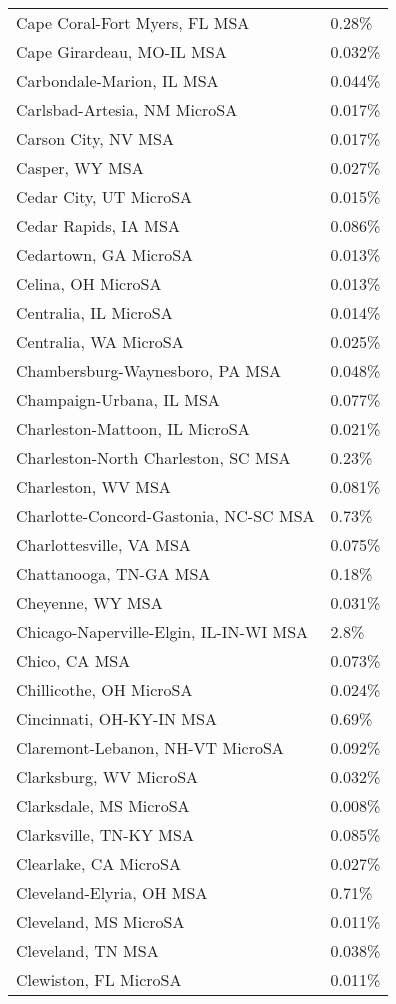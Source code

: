 \begin{longtable}[]{@{}ll@{}}
Cape Coral-Fort Myers, FL MSA & 0.28\% \\
Cape Girardeau, MO-IL MSA & 0.032\% \\
Carbondale-Marion, IL MSA & 0.044\% \\
Carlsbad-Artesia, NM MicroSA & 0.017\% \\
Carson City, NV MSA & 0.017\% \\
Casper, WY MSA & 0.027\% \\
Cedar City, UT MicroSA & 0.015\% \\
Cedar Rapids, IA MSA & 0.086\% \\
Cedartown, GA MicroSA & 0.013\% \\
Celina, OH MicroSA & 0.013\% \\
Centralia, IL MicroSA & 0.014\% \\
Centralia, WA MicroSA & 0.025\% \\
Chambersburg-Waynesboro, PA MSA & 0.048\% \\
Champaign-Urbana, IL MSA & 0.077\% \\
Charleston-Mattoon, IL MicroSA & 0.021\% \\
Charleston-North Charleston, SC MSA & 0.23\% \\
Charleston, WV MSA & 0.081\% \\
Charlotte-Concord-Gastonia, NC-SC MSA & 0.73\% \\
Charlottesville, VA MSA & 0.075\% \\
Chattanooga, TN-GA MSA & 0.18\% \\
Cheyenne, WY MSA & 0.031\% \\
Chicago-Naperville-Elgin, IL-IN-WI MSA & 2.8\% \\
Chico, CA MSA & 0.073\% \\
Chillicothe, OH MicroSA & 0.024\% \\
Cincinnati, OH-KY-IN MSA & 0.69\% \\
Claremont-Lebanon, NH-VT MicroSA & 0.092\% \\
Clarksburg, WV MicroSA & 0.032\% \\
Clarksdale, MS MicroSA & 0.008\% \\
Clarksville, TN-KY MSA & 0.085\% \\
Clearlake, CA MicroSA & 0.027\% \\
Cleveland-Elyria, OH MSA & 0.71\% \\
Cleveland, MS MicroSA & 0.011\% \\
Cleveland, TN MSA & 0.038\% \\
Clewiston, FL MicroSA & 0.011\% \\

\end{longtable}
